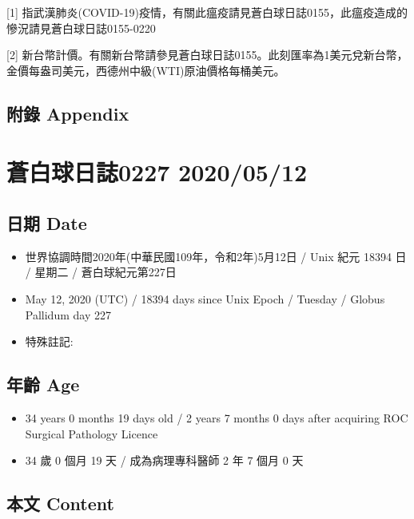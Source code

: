 \documentclass[
]{article}
\providecommand{\tightlist}{%
  \setlength{\itemsep}{0pt}\setlength{\parskip}{0pt}}
\begin{document}
{[}1{]}
指武漢肺炎(COVID-19)疫情，有關此瘟疫請見蒼白球日誌0155，此瘟疫造成的慘況請見蒼白球日誌0155-0220

{[}2{]}
新台幣計價。有關新台幣請參見蒼白球日誌0155。此刻匯率為1美元兌新台幣，金價每盎司美元，西德州中級(WTI)原油價格每桶美元。

\hypertarget{ux9644ux9304-appendix-10}{%
\subsection{附錄 Appendix}\label{ux9644ux9304-appendix-10}}

\hypertarget{ux84bcux767dux7403ux65e5ux8a8c0227-20200512}{%
\section{蒼白球日誌0227
2020/05/12}\label{ux84bcux767dux7403ux65e5ux8a8c0227-20200512}}

\hypertarget{ux65e5ux671f-date-11}{%
\subsection{日期 Date}\label{ux65e5ux671f-date-11}}

\begin{itemize}
\tightlist
\item
  世界協調時間2020年(中華民國109年，令和2年)5月12日 / Unix 紀元 18394 日
  / 星期二 / 蒼白球紀元第227日
\item
  May 12, 2020 (UTC) / 18394 days since Unix Epoch / Tuesday / Globus
  Pallidum day 227
\item
  特殊註記:
\end{itemize}

\hypertarget{ux5e74ux9f61-age-11}{%
\subsection{年齡 Age}\label{ux5e74ux9f61-age-11}}

\begin{itemize}
\tightlist
\item
  34 years 0 months 19 days old / 2 years 7 months 0 days after
  acquiring ROC Surgical Pathology Licence
\item
  34 歲 0 個月 19 天 / 成為病理專科醫師 2 年 7 個月 0 天
\end{itemize}

\hypertarget{ux672cux6587-content-11}{%
\subsection{本文 Content}\label{ux672cux6587-content-11}}
\end{document}
